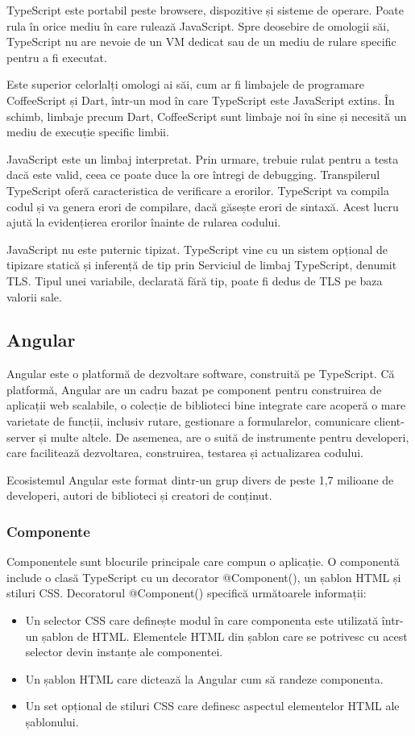 \documentclass[a4paper,12pt]{article}
\begin{document}
    TypeScript este portabil peste browsere, dispozitive și sisteme de operare. Poate rula în orice mediu în care rulează JavaScript. 
    Spre deosebire de omologii săi, TypeScript nu are nevoie de un VM dedicat sau de un mediu de rulare specific pentru a fi executat.

    Este superior celorlalți omologi ai săi, cum ar fi limbajele de programare CoffeeScript și Dart, într-un mod în care TypeScript
    este JavaScript extins. În schimb, limbaje precum Dart, CoffeeScript sunt limbaje noi în sine și necesită un mediu de execuție specific limbii.

    JavaScript este un limbaj interpretat. Prin urmare, trebuie rulat pentru a testa dacă este valid, ceea ce poate duce la ore întregi de debugging. 
    Transpilerul TypeScript oferă caracteristica de verificare a erorilor. TypeScript va compila codul și va genera erori de compilare, dacă găsește 
    erori de sintaxă. Acest lucru ajută la evidențierea erorilor înainte de rularea codului.

    JavaScript nu este puternic tipizat. TypeScript vine cu un sistem opțional de tipizare statică și inferență de tip prin Serviciul de limbaj TypeScript, denumit TLS. 
    Tipul unei variabile, declarată fără tip, poate fi dedus de TLS pe baza valorii sale.
    \subsection{Angular}
    Angular este o platformă de dezvoltare software, construită pe TypeScript. Că platformă, Angular are un cadru bazat pe component pentru construirea
    de aplicații web scalabile, o colecție de biblioteci bine integrate care acoperă o mare varietate de funcții, inclusiv rutare, gestionare a formularelor, 
    comunicare client-server și multe altele. De asemenea, are o suită de instrumente pentru developeri, care facilitează dezvoltarea, construirea, testarea
    și actualizarea codului.

    Ecosistemul Angular este format dintr-un grup divers de peste 1,7 milioane de developeri, autori de biblioteci și creatori de conținut.

    \subsubsection{Componente}
    Componentele sunt blocurile principale care compun o aplicație. O componentă include o clasă TypeScript cu un decorator @Component(), un șablon HTML și stiluri CSS.
    Decoratorul @Component() specifică următoarele informații:
    \begin{itemize}
        \item Un selector CSS care definește modul în care componenta este utilizată într-un șablon de HTML. Elementele HTML din șablon care se potrivesc cu acest
        selector devin instanțe ale componentei.
        \item Un șablon HTML care dictează la Angular cum să randeze componenta.
        \item Un set opțional de stiluri CSS care definesc aspectul elementelor HTML ale șablonului.
    \end{itemize}
\end{document}
